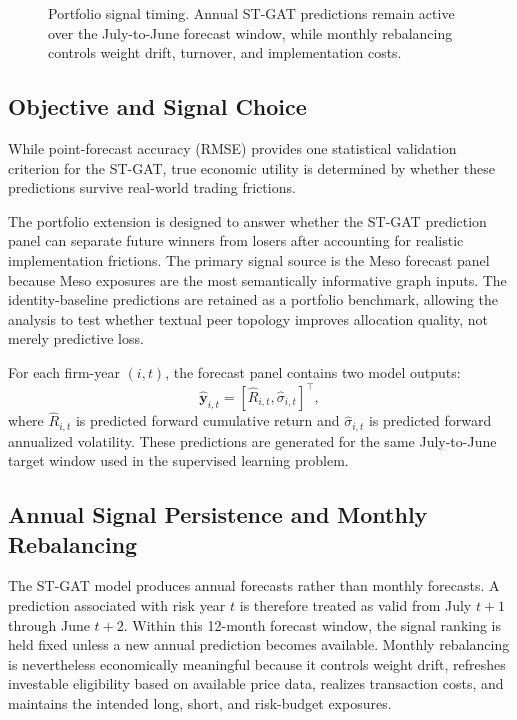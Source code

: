 \documentclass[11pt, a4paper]{article}
\begin{document}
\begin{figure}[H]
{
}
\caption[Portfolio signal timing]{Portfolio signal timing. Annual ST-GAT predictions remain active over the July-to-June forecast window, while monthly rebalancing controls weight drift, turnover, and implementation costs.}
\label{fig:portfolio_flowchart}
\end{figure}

\subsection{Objective and Signal Choice}
While point-forecast accuracy (RMSE) provides one statistical validation criterion for the ST-GAT, true economic utility is determined by whether these predictions survive real-world trading frictions.

The portfolio extension is designed to answer whether the ST-GAT prediction panel can separate future winners from losers after accounting for realistic implementation frictions. The primary signal source is the Meso forecast panel because Meso exposures are the most semantically informative graph inputs. The identity-baseline predictions are retained as a portfolio benchmark, allowing the analysis to test whether textual peer topology improves allocation quality, not merely predictive loss.

For each firm-year $(i,t)$, the forecast panel contains two model outputs:
\begin{equation}
\widehat{\mathbf{y}}_{i,t}=\left[\widehat{R}_{i,t},\widehat{\sigma}_{i,t}\right]^{\top},
\end{equation}
where $\widehat{R}_{i,t}$ is predicted forward cumulative return and $\widehat{\sigma}_{i,t}$ is predicted forward annualized volatility. These predictions are generated for the same July-to-June target window used in the supervised learning problem.

\subsection{Annual Signal Persistence and Monthly Rebalancing}
The ST-GAT model produces annual forecasts rather than monthly forecasts. A prediction associated with risk year $t$ is therefore treated as valid from July $t+1$ through June $t+2$. Within this 12-month forecast window, the signal ranking is held fixed unless a new annual prediction becomes available. Monthly rebalancing is nevertheless economically meaningful because it controls weight drift, refreshes investable eligibility based on available price data, realizes transaction costs, and maintains the intended long, short, and risk-budget exposures.
\end{document}
